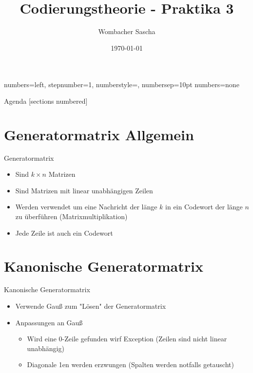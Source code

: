 \documentclass{beamer}
\title{Codierungstheorie - Praktika 3}
\date{\today}
\author{Wombacher Sascha \newline}
\begin{document}
  {numbers=left, stepnumber=1, numberstyle=\tiny, numbersep=10pt}
  {numbers=none}


  \maketitle
  \begin{frame}{Agenda}
    [sections numbered]
    \tableofcontents[hideallsubsections]
  \end{frame}
  
  
  \section{Generatormatrix Allgemein}
    \begin{frame}{Generatormatrix}
	\begin{itemize}
		\item Sind $k \times n$ Matrizen
		\item Sind Matrizen mit linear unabhängigen Zeilen
		\item Werden verwendet um eine Nachricht der länge $k$ in ein Codewort der länge $n$ zu überführen (Matrixmultiplikation)
		\item Jede Zeile ist auch ein Codewort
  	\end{itemize}
    \end{frame}

  \section{Kanonische Generatormatrix}
  \begin{frame}{Kanonische Generatormatrix}
  	\begin{itemize}
	  	\item Verwende Gauß zum "Lösen" \space der Generatormatrix
	  	\item Anpassungen an Gauß
	  	\begin{itemize}
	  	\item Wird eine 0-Zeile gefunden wirf Exception \newline (Zeilen sind nicht linear unabhängig)
	  	\item Diagonale 1en werden erzwungen \newline (Spalten werden notfalls getauscht)
	  	\end{itemize}
	\end{itemize}
  \end{frame}
  
\end{document}
